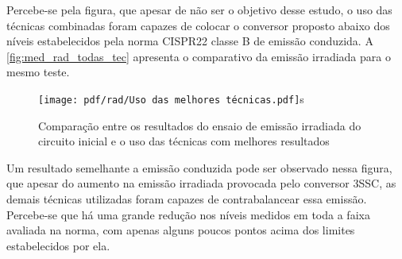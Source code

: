     Percebe-se pela figura, que apesar de não ser o objetivo desse estudo, o uso das técnicas combinadas foram capazes de colocar o conversor proposto abaixo dos níveis estabelecidos pela norma CISPR22 classe B de emissão conduzida. A \autoref{fig:med_rad_todas_tec} apresenta o comparativo da emissão irradiada para o mesmo teste. 
    
    \begin{figure}[H]
    	\centering
    	\caption{Comparação entre os resultados do ensaio de emissão irradiada do circuito inicial e o uso das técnicas com melhores resultados}
    	\texttt{[image: pdf/rad/Uso das melhores técnicas.pdf]}s
    	\label{fig:med_rad_todas_tec}
    \end{figure}
    
    Um resultado semelhante a emissão conduzida pode ser observado nessa figura, que apesar do aumento na emissão irradiada provocada pelo conversor 3SSC, as demais técnicas utilizadas foram capazes de contrabalancear essa emissão. Percebe-se que há uma grande redução nos níveis medidos em toda a faixa avaliada na norma, com apenas alguns poucos pontos acima dos limites estabelecidos por ela. 
    
    